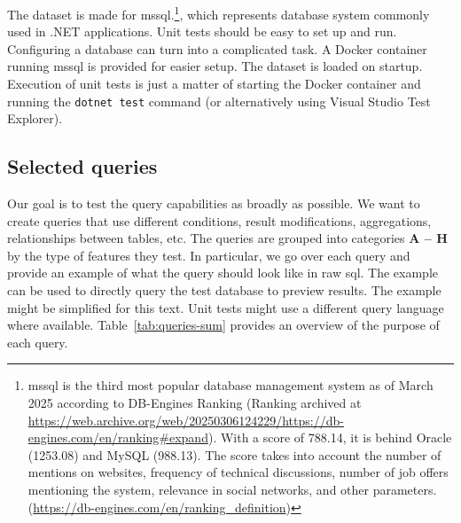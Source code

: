 The dataset is made for \acrshort{mssql}.\footnote{\acrshort{mssql} is the third most popular database management system as of March 2025 according to DB-Engines Ranking (Ranking archived at \url{https://web.archive.org/web/20250306124229/https://db-engines.com/en/ranking\#expand}). With a score of 788.14, it is behind Oracle (1253.08) and MySQL (988.13). The score takes into account the number of mentions on websites, frequency of technical discussions, number of job offers mentioning the system, relevance in social networks, and other parameters. (\url{https://db-engines.com/en/ranking_definition})}, which represents database system commonly used in .NET applications.
Unit tests should be easy to set up and run. Configuring a database can turn into a complicated task. A Docker container running \acrshort{mssql} is provided for easier setup. The dataset is loaded on startup. Execution of unit tests is just a matter of starting the Docker container and running the \texttt{dotnet test} command (or alternatively using Visual Studio Test Explorer). 

\subsection{Selected queries}
\label{sec:selected_queries}
Our goal is to test the query capabilities as broadly as possible. We want to create queries that use different conditions, result modifications, aggregations, relationships between tables, etc. The queries are grouped into categories \textbf{A -- H} by the type of features they test. In particular, we go over each query and provide an example of what the query should look like in raw \acrshort{sql}. The example can be used to directly query the test database to preview results. The example might be simplified for this text. Unit tests might use a different query language where available. Table~\ref{tab:queries-sum} provides an overview of the purpose of each query.


